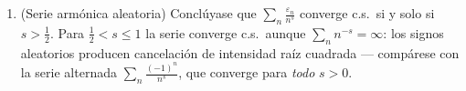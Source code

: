 \begin{problem}
\begin{enumerate}[resume]
  \emph{desigualdad de Paley--Zygmund}: para $Z \geq 0$ con
  $\E Z^2 < \infty$ y $0 < \theta <
        1$,
        \[
        \P\bigl(Z > \theta\,\E Z\bigr) \;\geq\; (1 -
        \theta)^2\,\frac{(\E Z)^2}{\E Z^2}
        \]
        \emph{(pártase $\E Z$ en el nivel $\theta\E Z$ y aplíquese
        Cauchy--Schwarz al trozo superior)}. (b) Demuéstrese
        $\E T_n^4 \leq 3s_n^4$. (c) Dedúzcase
        $\P\bigl(\abs{T_n} > \frac{s_n}2\bigr)
        \geq \frac3{16}$ y conclúyase que $\sum_nx_n\varepsilon_n$
        diverge c.s.; de ahí la dicotomía
        \[
        \sum_nx_n\varepsilon_n\ \text{converge c.s.}
        \iff \sum_nx_n^2 < \infty .
        \]
  \item (Serie armónica aleatoria) Conclúyase que
  $\sum_n\frac{\varepsilon_n}{n^s}$ converge c.s.\ si y solo si
  $s > \frac12$. Para $\frac12 < s \leq
        1$ la serie converge c.s.\ aunque $\sum_nn^{-s} = \infty$: los
  signos aleatorios producen cancelación de intensidad raíz cuadrada ---
  compárese con la serie alternada $\sum_n\frac{(-1)^n}{n^s}$, que
  converge para \emph{todo} $s > 0$.
\end{enumerate}


\end{problem}
